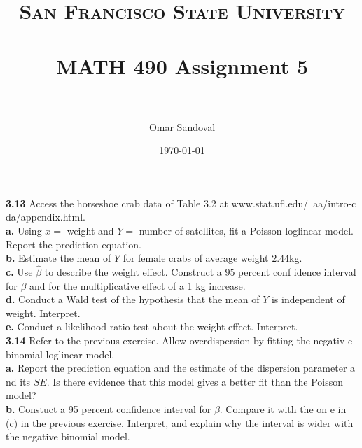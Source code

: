 \documentclass[paper=letter, fontsize=11pt]{scrartcl} %
\title{	
\normalfont \normalsize 
\textsc{San Francisco State University} \\ [25pt]
\horrule{0.5pt} \\[0.4cm] %
\huge MATH 490 Assignment 5  \\ %
\horrule{2pt} \\[0.5cm] %
}
\author{Omar Sandoval}
\date{\normalsize\today}
\begin{document}
\maketitle

\textbf{3.13} Access the horseshoe crab data of Table 3.2 at www.stat.ufl.edu/~aa/intro-c
da/appendix.html. \\
\textbf{a.} Using $x=$ weight and $Y =$ number of satellites, fit a Poisson loglinear
model. Report the prediction equation. \\
\textbf{b.} Estimate the mean of $Y$ for female crabs of average weight $2.44$kg. \\
\textbf{c.} Use $\hat{\beta}$ to describe the weight effect. Construct a $95$ percent conf
idence interval for $\beta$ and for the multiplicative effect of a 1 kg increase. \\
\textbf{d.} Conduct a Wald test of the hypothesis that the mean of $Y$ is independent of 
weight. Interpret. \\
\textbf{e.} Conduct a likelihood-ratio test about the weight effect. Interpret. \\

\textbf{3.14} Refer to the previous exercise. Allow overdispersion by fitting the negativ
e binomial loglinear model. \\
\textbf{a.} Report the prediction equation and the estimate of the dispersion parameter a
nd its $SE$. Is there evidence that this model gives a better fit than the Poisson model?
\\
\textbf{b.} Constuct a 95 percent confidence interval for $\beta$. Compare it with the on
e in (c) in the previous exercise. Interpret, and explain why the interval is wider with 
the negative binomial model. \\
\end{document}
